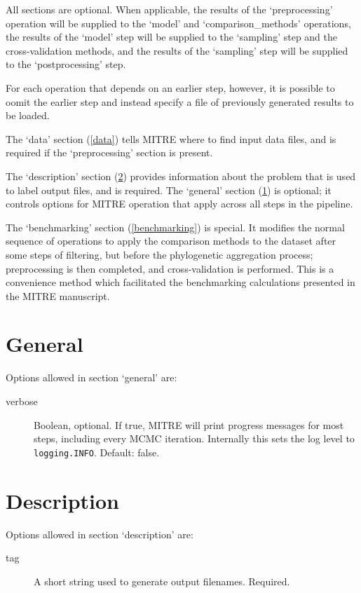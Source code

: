 \documentclass[12pt]{report}
\begin{document}
All sections are optional. When applicable, the results of the
`preprocessing' operation will be supplied to the `model'
and `comparison\_methods' operations, the results of the `model'
step will be supplied to the `sampling' step and the
cross-validation methods, and the results of the `sampling' step
will be supplied to the `postprocessing' step.

For each operation that depends on an earlier step, however, it is
possible to oomit the earlier step and instead specify a file of
previously generated results to be loaded.

The `data' section (\ref{data}) tells MITRE where to find input data files,
and is required if the `preprocessing' section is present.

The `description' section (\ref{description}) provides information
about the problem that is used to label output files, and is
required. The `general' section (\ref{general}) is optional; it
controls options for MITRE operation that apply across all steps in
the pipeline.

The `benchmarking' section (\ref{benchmarking}) is special. It
modifies the normal sequence of operations to apply the comparison
methods to the dataset after some steps of filtering, but before the
phylogenetic aggregation process; preprocessing is then completed, and
cross-validation is performed. This is a convenience method which
facilitated the benchmarking calculations presented in the MITRE
manuscript.

\section{General}\label{general}
Options allowed in section `general' are:
\begin{description}
\item[verbose] Boolean, optional. If true, MITRE will print progress
  messages for most steps, including every MCMC iteration. Internally
  this sets the log level to \texttt{logging.INFO}. Default: false.
\end{description}

\section{Description}\label{description}
Options allowed in section `description' are:
\begin{description}
\item[tag] A short string used to generate output filenames. Required.
\end{description}
\end{document}
